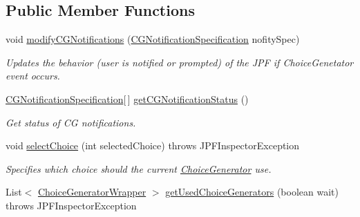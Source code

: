 \subsection*{Public Member Functions}
\begin{DoxyCompactItemize}
\item 
void \hyperlink{interfacegov_1_1nasa_1_1jpf_1_1inspector_1_1interfaces_1_1_choice_generators_interface_a7c85aa8be525bc12e0fcacfbdb7e3094}{modify\+C\+G\+Notifications} (\hyperlink{classgov_1_1nasa_1_1jpf_1_1inspector_1_1interfaces_1_1_choice_generators_interface_1_1_c_g_notification_specification}{C\+G\+Notification\+Specification} nofity\+Spec)
\begin{DoxyCompactList}\small\item\em Updates the behavior (user is notified or prompted) of the J\+PF if Choice\+Genetator event occurs. \end{DoxyCompactList}\item 
\hyperlink{classgov_1_1nasa_1_1jpf_1_1inspector_1_1interfaces_1_1_choice_generators_interface_1_1_c_g_notification_specification}{C\+G\+Notification\+Specification}\mbox{[}$\,$\mbox{]} \hyperlink{interfacegov_1_1nasa_1_1jpf_1_1inspector_1_1interfaces_1_1_choice_generators_interface_a50be99532b75699fd9b5b24b38bd27ca}{get\+C\+G\+Notification\+Status} ()
\begin{DoxyCompactList}\small\item\em Get status of CG notifications. \end{DoxyCompactList}\item 
void \hyperlink{interfacegov_1_1nasa_1_1jpf_1_1inspector_1_1interfaces_1_1_choice_generators_interface_a055b8d48f863633614dee147bc607ed7}{select\+Choice} (int selected\+Choice)  throws J\+P\+F\+Inspector\+Exception
\begin{DoxyCompactList}\small\item\em Specifies which choice should the current \hyperlink{}{Choice\+Generator} use. \end{DoxyCompactList}\item 
List$<$ \hyperlink{classgov_1_1nasa_1_1jpf_1_1inspector_1_1utils_1_1_choice_generator_wrapper}{Choice\+Generator\+Wrapper} $>$ \hyperlink{interfacegov_1_1nasa_1_1jpf_1_1inspector_1_1interfaces_1_1_choice_generators_interface_aba03345fdef7f19fdebe45ff7f873297}{get\+Used\+Choice\+Generators} (boolean wait)  throws J\+P\+F\+Inspector\+Exception
\end{DoxyCompactItemize}
